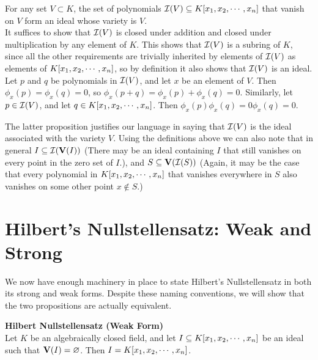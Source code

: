 \documentclass[twoside]{report}
\begin{document}
\begin{proposition} For any set $V \subset K$, the set of polynomials
  $\mathcal{I}(V) \subseteq K[x_1, x_2,\cdots,x_n]$ that vanish on $V$ form an ideal
  whose variety is $V$.\\

  It suffices to show that $\mathcal{I}(V)$ is closed under addition and
  closed under multiplication by any element of $K$.  This shows that
  $\mathcal{I}(V)$ is a subring of $K$, since all the other requirements
  are trivially inherited by elements of $\mathcal{I}(V)$ as elements of
  $K[x_1, x_2,\cdots,x_n]$, so by definition it also shows that $\mathcal{I}(V)$ is
  an ideal.\\

  Let $p$ and $q$ be polynomials in $\mathcal{I}(V)$, and let $x$ be an
  element of $V$. Then $\phi_x(p) = \phi_x(q) = 0$, so $\phi_x(p + q)
  = \phi_x(p) + \phi_x(q) = 0$.  Similarly, let $p \in \mathcal{I}(V)$,
  and let $q \in K[x_1, x_2,\cdots,x_n]$.  Then $\phi_x(p)\phi_x(q) = 0\phi_x(q) =
  0$.
\end{proposition}

The latter proposition justifies our language in saying that
$\mathcal{I}(V)$ is the ideal associated with the variety $V$.  Using
the definitions above we can also note that in general $I \subseteq
\mathcal{I}(\mathbf{V}(I))$ (There may be an ideal containing $I$ that
still vanishes on every point in the zero set of $I$.), and $S
\subseteq \mathbf{V}(\mathcal{I}(S))$ (Again, it may be the case that
every polynomial in $K[x_1, x_2,\cdots,x_n]$ that vanishes everywhere in $S$ also
vanishes on some other point $x \notin S$.)

\section{Hilbert's Nullstellensatz: Weak and Strong}

We now have enough machinery in place to state Hilbert's
Nullstellensatz in both its strong and weak forms.  Despite these
naming conventions, we will show that the two propositions are
actually equivalent.

\begin{theorem} \textbf{Hilbert Nullstellensatz (Weak Form)}\\ 

  Let $K$ be an algebraically closed field, and let $I \subseteq
  K[x_1, x_2,\cdots,x_n]$ be an ideal such that $\mathbf{V}(I) = \varnothing$.  Then $I =
  K[x_1, x_2,\cdots,x_n]$.
\end{theorem}
\end{document}
